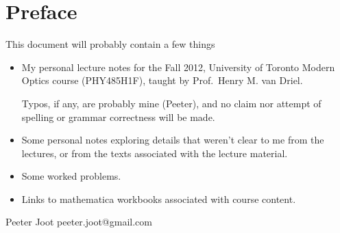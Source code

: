 \chapter*{Preface}\normalsize

This document will probably contain a few things

\begin{itemize}
\item My personal lecture notes for the Fall 2012, University of Toronto Modern Optics course (PHY485H1F), taught by Prof.\ Henry M. van Driel.

Typos, if any, are probably mine (Peeter), and no claim nor attempt of spelling or grammar correctness will be made.

\item Some personal notes exploring details that weren't clear to me from the lectures, or from the texts associated with the lecture material.

\item Some worked problems.

\item Links to mathematica workbooks associated with course content.

\end{itemize}

Peeter Joot  \quad peeter.joot@gmail.com 

